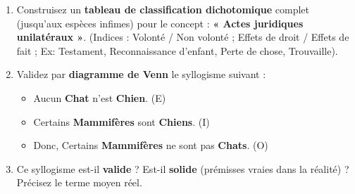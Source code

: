 \documentclass[11pt]{article}
\begin{document}
\begin{exercice}
\begin{enumerate}
    \item Construisez un \textbf{tableau de classification dichotomique} complet (jusqu'aux espèces infimes) pour le concept : \textbf{« Actes juridiques unilatéraux »}. (Indices : Volonté / Non volonté ; Effets de droit / Effets de fait ; Ex: Testament, Reconnaissance d'enfant, Perte de chose, Trouvaille).
    \item Validez par \textbf{diagramme de Venn} le syllogisme suivant :
    \begin{itemize}
        \item Aucun \textbf{Chat} n'est \textbf{Chien}. (E)
        \item Certains \textbf{Mammifères} sont \textbf{Chiens}. (I)
        \item Donc, Certains \textbf{Mammifères} ne sont pas \textbf{Chats}. (O)
    \end{itemize}
    \item Ce syllogisme est-il \textbf{valide} ? Est-il \textbf{solide} (prémisses vraies dans la réalité) ? Précisez le terme moyen réel.
\end{enumerate}
\end{exercice}
\end{document}
